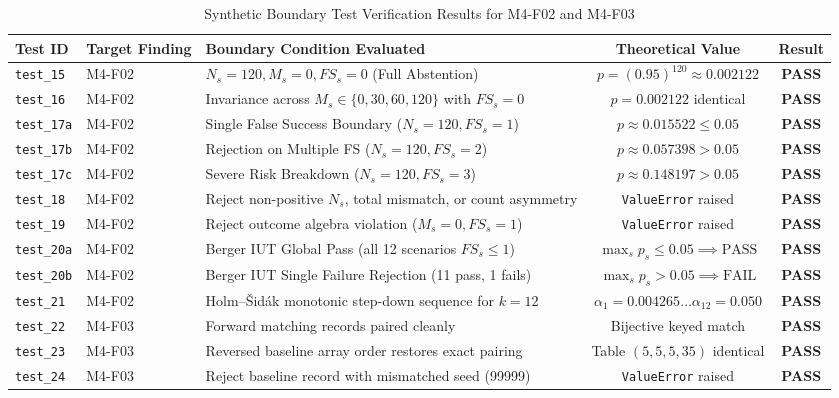 \documentclass[10pt,a4paper]{article}
\begin{document}
\begin{table}[htbp]
\centering
\small
\caption{Synthetic Boundary Test Verification Results for M4-F02 and M4-F03}
\label{tab:synthetic_evidence}
\begin{tabularx}{\textwidth}{llXcc}
\toprule
\textbf{Test ID} & \textbf{Target Finding} & \textbf{Boundary Condition Evaluated} & \textbf{Theoretical Value} & \textbf{Result} \\
\midrule
\texttt{test\_15} & M4-F02 & $N_s=120, M_s=0, FS_s=0$ (Full Abstention) & $p = (0.95)^{120} \approx 0.002122$ & \textbf{PASS} \\
\texttt{test\_16} & M4-F02 & Invariance across $M_s \in \{0, 30, 60, 120\}$ with $FS_s=0$ & $p = 0.002122$ identical & \textbf{PASS} \\
\texttt{test\_17a}& M4-F02 & Single False Success Boundary ($N_s=120, FS_s=1$) & $p \approx 0.015522 \le 0.05$ & \textbf{PASS} \\
\texttt{test\_17b}& M4-F02 & Rejection on Multiple FS ($N_s=120, FS_s=2$) & $p \approx 0.057398 > 0.05$ & \textbf{PASS} \\
\texttt{test\_17c}& M4-F02 & Severe Risk Breakdown ($N_s=120, FS_s=3$) & $p \approx 0.148197 > 0.05$ & \textbf{PASS} \\
\texttt{test\_18} & M4-F02 & Reject non-positive $N_s$, total mismatch, or count asymmetry & \texttt{ValueError} raised & \textbf{PASS} \\
\texttt{test\_19} & M4-F02 & Reject outcome algebra violation ($M_s=0, FS_s=1$) & \texttt{ValueError} raised & \textbf{PASS} \\
\texttt{test\_20a}& M4-F02 & Berger IUT Global Pass (all 12 scenarios $FS_s \le 1$) & $\max_s p_s \le 0.05 \implies \text{PASS}$ & \textbf{PASS} \\
\texttt{test\_20b}& M4-F02 & Berger IUT Single Failure Rejection (11 pass, 1 fails) & $\max_s p_s > 0.05 \implies \text{FAIL}$ & \textbf{PASS} \\
\texttt{test\_21} & M4-F02 & Holm--Šidák monotonic step-down sequence for $k=12$ & $\alpha_1=0.004265 \dots \alpha_{12}=0.050$ & \textbf{PASS} \\
\midrule
\texttt{test\_22} & M4-F03 & Forward matching records paired cleanly & Bijective keyed match & \textbf{PASS} \\
\texttt{test\_23} & M4-F03 & Reversed baseline array order restores exact pairing & Table $(5, 5, 5, 35)$ identical & \textbf{PASS} \\
\texttt{test\_24} & M4-F03 & Reject baseline record with mismatched seed (99999) & \texttt{ValueError} raised & \textbf{PASS} \\

\end{tabularx}
\end{table}
\end{document}
